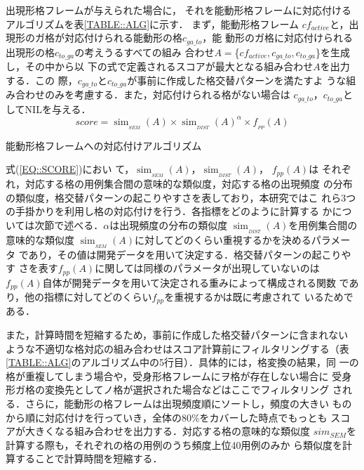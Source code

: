 \documentclass[japanese]{jnlp_1.4}
\begin{document}
  出現形格フレームが与えられた場合に，
それを能動形格フレームに対応付ける
  アルゴリズムを表\ref{TABLE::ALG}に示す．
まず，能動形格フレーム
  $cf_{active}$と，出現形のガ格が対応付けられる能動形の格$c_{ga\_to}$，能
  動形のガ格に対応付けられる出現形の格$c_{to\_ga}$の考えうるすべての組み
  合わせ$A=$\{$cf_{active},c_{ga\_to},c_{to\_ga}$\}を生成し，その中から以
  下の式で定義されるスコアが最大となる組み合わせ$A$を出力する．この
  際，$c_{ga\_to}$と$c_{to\_ga}$が事前に作成した格交替パターンを満たすよ
  うな組み合わせのみを考慮する．また，対応付けられる格がない場合は
  $c_{ga\_to}$，$c_{to\_ga}$としてNILを与える．\ \\\vspace{-5ex}
  \begin{equation}
   \mathit{score} = \operatorname{sim}_{_\mathit{SEM}}(A)\times
	\operatorname{sim}_{_\mathit{DIST}}(A)^\alpha\times f_{_\mathit{PP}}(A) 
	\label{EQ::SCORE}
  \end{equation} 

  \begin{table}[t]
  \caption{能動形格フレームへの対応付けアルゴリズム} \label{TABLE::ALG}

  \end{table}

  式(\ref{EQ::SCORE})におい
  て，$\operatorname{sim}_{_\mathit{SEM}}(A)$，$\operatorname{sim}_{_\mathit{DIST}}(A)$，
$f_\mathit{pp}(A)$は
  それぞれ，対応する格の用例集合間の意味的な類似度，対応する格の出現頻度
  の分布の類似度，格交替パターンの起こりやすさを表しており，本研究ではこ
  れら3つの手掛かりを利用し格の対応付けを行う．各指標をどのように計算する
  かについては次節で述べる．$\alpha$は出現頻度の分布の類似度
  $\operatorname{sim}_{_\mathit{DIST}}(A)$を用例集合間の意味的な類似度
  $\operatorname{sim}_{_\mathit{SEM}}(A)$に対してどのくらい重視するかを決めるパラメータ
  であり，その値は開発データを用いて決定する．格交替パターンの起こりやす
  さを表す$f_\mathit{pp}(A)$に関しては同様のパラメータが出現していないのは
  $f_\mathit{pp}(A)$自体が開発データを用いて決定される重みによって構成される関数
  であり，他の指標に対してどのくらい$f_\mathit{pp}$を重視するかは既に考慮されて
  いるためである．

  また，計算時間を短縮するため，事前に作成した格交替パターンに含まれない
  ような不適切な格対応の組み合わせはスコア計算前にフィルタリングする（表
  \ref{TABLE::ALG}のアルゴリズム中の5行目）．具体的には，格変換の結果，同
  一の格が重複してしまう場合や，受身形格フレームにヲ格が存在しない場合に
  受身形ガ格の変換先としてノ格が選択された場合などはここでフィルタリング
  される．さらに，能動形の格フレームは出現頻度順にソートし，頻度の大きい
  ものから順に対応付けを行っていき，全体の80\%をカバーした時点でもっとも
  スコアが大きくなる組み合わせを出力する．対応する格の意味的な類似度
  $sim_{SEM}$を計算する際も，それぞれの格の用例のうち頻度上位40用例のみか
  ら類似度を計算することで計算時間を短縮する．
 
\end{document}
